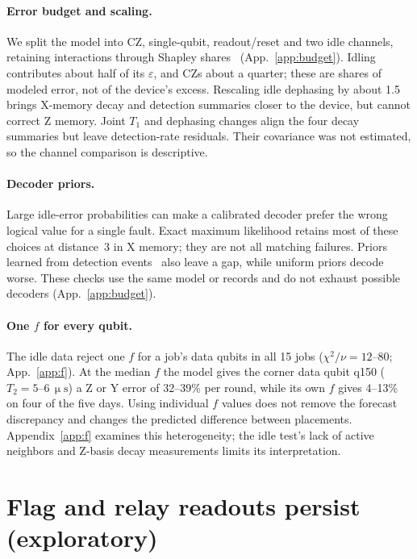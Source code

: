 \documentclass[aps,pra,reprint,nofootinbib,longbibliography,floatfix,showkeys]{revtex4-2}
\newcommand{\eps}{\varepsilon}
\newcommand{\us}{\,\upmu\mathrm{s}}
\begin{document}
\paragraph*{Error budget and scaling.}
We split the model into CZ, single-qubit, readout/reset and two idle channels, retaining interactions through Shapley shares~\cite{shapley1953value} (App.~\ref{app:budget}).
Idling contributes about half of its $\eps$, and CZs about a quarter; these are shares of modeled error, not of the device's excess.
Rescaling idle dephasing by about 1.5 brings X-memory decay and detection summaries closer to the device, but cannot correct Z memory.
Joint $T_1$ and dephasing changes align the four decay summaries but leave detection-rate residuals.
Their covariance was not estimated, so the channel comparison is descriptive.

\paragraph*{Decoder priors.}
Large idle-error probabilities can make a calibrated decoder prefer the wrong logical value for a single fault.
Exact maximum likelihood retains most of these choices at distance~3 in X memory; they are not all matching failures.
Priors learned from detection events~\cite{google2021exponential,takou2026logical} also leave a gap, while uniform priors decode worse.
These checks use the same model or records and do not exhaust possible decoders (App.~\ref{app:budget}).

\paragraph*{One $f$ for every qubit.}
The idle data reject one $f$ for a job's data qubits in all 15 jobs ($\chi^2/\nu = 12$--80; App.~\ref{app:f}).
At the median $f$ the model gives the corner data qubit q150 ($T_2 = 5$--$6\us$) a Z or Y error of 32--39\% per round, while its own $f$ gives 4--13\% on four of the five days.
Using individual $f$ values does not remove the forecast discrepancy and changes the predicted difference between placements.
Appendix~\ref{app:f} examines this heterogeneity; the idle test's lack of active neighbors and Z-basis decay measurements limits its interpretation.

\section{Flag and relay readouts persist (exploratory)}
\label{sec:leakage}
\end{document}

